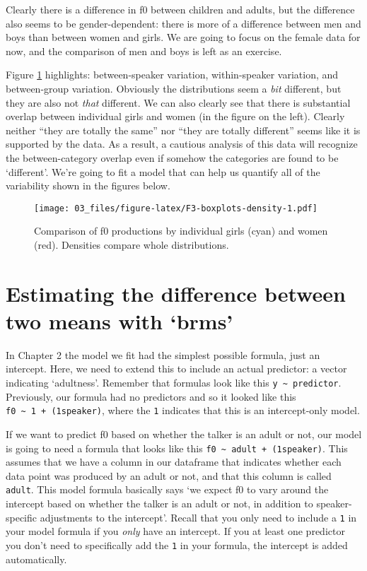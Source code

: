\documentclass[
]{book}
\begin{document}
Clearly there is a difference in f0 between children and adults, but the difference also seems to be gender-dependent: there is more of a difference between men and boys than between women and girls. We are going to focus on the female data for now, and the comparison of men and boys is left as an exercise.

Figure \ref{fig:F3-boxplots-density} highlights: between-speaker variation, within-speaker variation, and between-group variation. Obviously the distributions seem a \emph{bit} different, but they are also not \emph{that} different. We can also clearly see that there is substantial overlap between individual girls and women (in the figure on the left). Clearly neither ``they are totally the same'' nor ``they are totally different'' seems like it is supported by the data. As a result, a cautious analysis of this data will recognize the between-category overlap even if somehow the categories are found to be `different'. We're going to fit a model that can help us quantify all of the variability shown in the figures below.

\begin{figure}
\centering
\texttt{[image: 03\_files/figure-latex/F3-boxplots-density-1.pdf]}
\caption{\label{fig:F3-boxplots-density}Comparison of f0 productions by individual girls (cyan) and women (red). Densities compare whole distributions.}
\end{figure}

\hypertarget{estimating-the-difference-between-two-means-with-brms}{%
\section{Estimating the difference between two means with `brms'}\label{estimating-the-difference-between-two-means-with-brms}}

In Chapter 2 the model we fit had the simplest possible formula, just an intercept. Here, we need to extend this to include an actual predictor: a vector indicating `adultness'. Remember that formulas look like this \texttt{y\ \textasciitilde{}\ predictor}. Previously, our formula had no predictors and so it looked like this \texttt{f0\ \textasciitilde{}\ 1\ +\ (1\textbar{}speaker)}, where the \texttt{1} indicates that this is an intercept-only model.

If we want to predict f0 based on whether the talker is an adult or not, our model is going to need a formula that looks like this \texttt{f0\ \textasciitilde{}\ adult\ +\ (1\textbar{}speaker)}. This assumes that we have a column in our dataframe that indicates whether each data point was produced by an adult or not, and that this column is called \texttt{adult}. This model formula basically says `we expect f0 to vary around the intercept based on whether the talker is an adult or not, in addition to speaker-specific adjustments to the intercept'. Recall that you only need to include a \texttt{1} in your model formula if you \emph{only} have an intercept. If you at least one predictor you don't need to specifically add the \texttt{1} in your formula, the intercept is added automatically.
\end{document}
